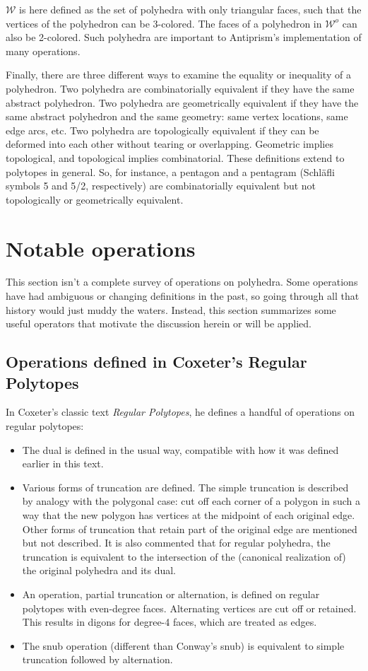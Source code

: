 \documentclass[12pt]{amsart}%
\begin{document}
$\mathcal{W}$ is here defined as the set of polyhedra with only triangular
faces, such that the vertices of the polyhedron can be 3-colored. The faces of
a polyhedron in $\mathcal{W}^o$ can also be 2-colored. Such polyhedra are
important to Antiprism's implementation of many operations.

Finally, there are three different ways to examine the equality or inequality
of a polyhedron. Two polyhedra are combinatorially equivalent if they have the
same abstract polyhedron. Two polyhedra are geometrically equivalent if they
have the same abstract polyhedron and the same geometry: same vertex
locations, same edge arcs, etc. Two polyhedra are topologically equivalent if
they can be deformed into each other without tearing or overlapping.
Geometric implies topological, and topological implies combinatorial. These
definitions extend to polytopes in general. So, for instance, a pentagon and a
pentagram (Schläfli symbols {5} and {5/2}, respectively) are combinatorially
equivalent but not topologically or geometrically equivalent.

\section{Notable operations}

This section isn't a complete survey of operations on polyhedra. Some
operations have had ambiguous or changing definitions in the past, so going
through all that history would just muddy the waters. Instead, this section
summarizes some useful operators that motivate the discussion herein or will
be applied.

\subsection{Operations defined in Coxeter's Regular Polytopes}

In Coxeter's classic text \textit{Regular Polytopes}\cite{coxeter73},
he defines a handful of operations on regular polytopes:
\begin{itemize}
  \item The dual is defined in the usual way, compatible with how it was
  defined earlier in this text.
  \item Various forms of truncation are defined. The simple truncation is
  described by analogy with the polygonal case: cut off each corner of a
  polygon in such a way that the new polygon has vertices at the midpoint of
  each original edge. Other forms of truncation that retain part of the original
  edge are mentioned but not described. It is also commented that for regular
  polyhedra, the truncation is equivalent to the intersection
  of the (canonical realization of) the original polyhedra and its dual.
  \item An operation, partial truncation or alternation, is defined on regular
  polytopes with even-degree faces. Alternating vertices are cut off or
  retained. This results in digons for degree-4 faces,
  which are treated as edges.
  \item The snub operation (different than Conway's snub)
  is equivalent to simple truncation followed by alternation.
\end{itemize}
\end{document}
